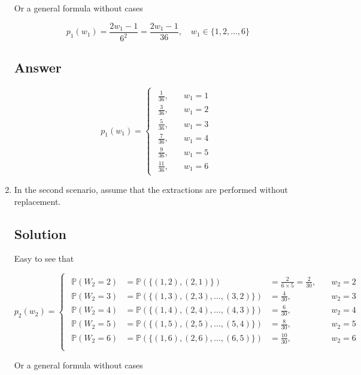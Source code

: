 \documentclass[12pt]{article}
\newcommand{\bP}{\mathbb{P}}
\begin{document}
\begin{enumerate}[start=1,label={\bfseries Part \arabic*:},leftmargin=0in]
			Or a general formula without cases
			
			\[p_1(w_1) = \frac{2w_1-1}{6^2} = \frac{2w_1-1}{36},\quad w_1\in \{1,2,\dots,6\}\]
		
		\subsection*{Answer}
		
			\[\boxed{p_1(w_1) =
				\begin{cases}
					\begin{aligned}
						\frac{1}{36},&\quad w_1 = 1\\
						\frac{3}{36},&\quad w_1 = 2\\
						\frac{5}{36},&\quad w_1 = 3\\
						\frac{7}{36},&\quad w_1 = 4\\
						\frac{9}{36},&\quad w_1 = 5\\
						\frac{11}{36},&\quad w_1 = 6
					\end{aligned}
			\end{cases}}\]
		
		\bigskip\item In the second scenario, assume that the extractions are performed without replacement.
		
		\subsection*{Solution}
		
			Easy to see that
			
			\[
			p_2(w_2) =
			\begin{cases}
				\begin{aligned}
					\bP(W_2 = 2) &= \bP(\{(1,2),(2,1)\}) &= \frac{2}{6\times 5} = \frac{2}{30},&\quad w_2 = 2\\
					\bP(W_2 = 3) &= \bP(\{(1,3),(2,3),\dots,(3,2)\}) &= \frac{4}{30},&\quad w_2 = 3\\
					\bP(W_2 = 4) &= \bP(\{(1,4),(2,4),\dots,(4,3)\}) &= \frac{6}{30},&\quad w_2 = 4\\
					\bP(W_2 = 5) &= \bP(\{(1,5),(2,5),\dots,(5,4)\}) &= \frac{8}{30},&\quad w_2 = 5\\
					\bP(W_2 = 6) &= \bP(\{(1,6),(2,6),\dots,(6,5)\}) &= \frac{10}{30},&\quad w_2 = 6\\
				\end{aligned}
			\end{cases}
			\]
			
			Or a general formula without cases
			

\end{enumerate}
\end{document}
